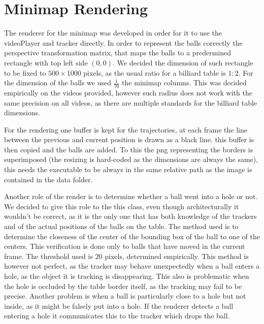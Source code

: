 \section{Minimap Rendering}

The renderer for the minimap was developed in order for it to use the videoPlayer and 
tracker directly. In order to represent the balls correctly the perspective transformation
matrix, that maps the balls to a predermined rectangle with top left side $(0,0)$. We decided
the dimension of such rectangle to be fixed to $500 \times 1000$ pixels, as the usual ratio
for a billiard table is $1:2$. For the dimension of the balls we used $\frac{1}{70}$ the minimap
columns. This was decided empirically on the videos provided, however such radius does not work
with the same precision on all videos, as there are multiple standards for the billiard table 
dimensions.\par 
For the rendering one buffer is kept for the trajectories, at each frame the line between the
previous and current position is drawn as a black line. this buffer is then copied and the
balls are added. To this the png representing the borders is superimposed (the resizing is hard-coded
as the dimensions are always the same), this needs the executable to be always in the same relative
path as the image is contained in the data folder.\par 
Another role of the render is to determine whether a ball went into a hole or not. We decided to
give this role to the this class, even though architecturally it wouldn't be correct, as it is the 
only one that has both knowledge of the trackers and of the actual positions of the balls on the table.
The method used is to determine the closeness of the center of the bounding box of the ball to one 
of the centers. This verification is done only to balls that have moved in the current frame. The
threshold used is 20 pixels, determined empirically. This method is however not perfect, as the 
tracker may behave unexpectedly when a ball enters a hole, as the object it is tracking is disappearing.
This also is problematic when the hole is occluded by the table border itself, as the tracking may fail
to be precise. Another problem is when a ball is particularly close to a hole but not inside, as it
might be falsely put into a hole. If the renderer detects a ball entering a hole it communicates
this to the tracker which drops the ball.

